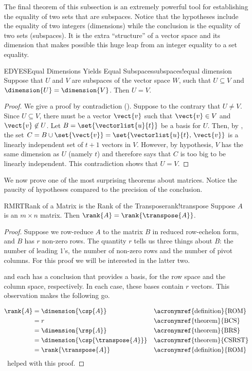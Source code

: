%
The final theorem of this subsection is an extremely powerful tool for establishing the equality of two sets that are subspaces.  Notice that the hypotheses include the equality of two integers (dimensions) while the conclusion is the equality of two sets (subspaces).  It is the extra ``structure'' of a vector space and its dimension that makes possible this huge leap from an integer equality to a set equality.
%
\begin{theorem}{EDYES}{Equal Dimensions Yields Equal Subspaces}{subspaces!equal dimension}
Suppose that $U$ and $V$ are subspaces of the vector space $W$, such that $U\subseteq V$ and $\dimension{U}=\dimension{V}$.  Then $U=V$.
\end{theorem}
%
\begin{proof}
%
We give a proof by contradiction ().  Suppose to the contrary that $U\neq V$.  Since $U\subseteq V$, there must be a vector $\vect{v}$ such that $\vect{v}\in V$ and $\vect{v}\not\in U$.  Let $B=\set{\vectorlist{u}{t}}$ be a basis for $U$.  Then, by , the set $C=B\cup\set{\vect{v}}=\set{\vectorlist{u}{t},\,\vect{v}}$ is a linearly independent set of $t+1$ vectors in $V$.  However, by hypothesis, $V$ has the same dimension as $U$ (namely $t$) and therefore  says that $C$ is too big to be linearly independent.  This contradiction shows that $U=V$.
%
\end{proof}
%
%
We now prove one of the most surprising theorems about matrices.  Notice the paucity of hypotheses compared to the precision of the conclusion.
%
\begin{theorem}{RMRT}{Rank of a Matrix is the Rank of the Transpose}{rank!transpose}
Suppose $A$ is an $m\times n$ matrix.  Then $\rank{A}=\rank{\transpose{A}}$.
\end{theorem}
%
\begin{proof}
%
Suppose we row-reduce $A$ to the matrix $B$ in reduced row-echelon form, and $B$ has $r$ non-zero rows.  The quantity $r$ tells us three things about $B$: the number of leading 1's, the number of non-zero rows and the number of pivot columns.  For this proof we will be interested in the latter two.\par
%
 and  each has a conclusion that provides a basis, for the row space and the column space, respectively.  In each case, these bases contain $r$ vectors.  This observation makes the following go.\par
%
\begin{align*}
\rank{A}
%
&=\dimension{\csp{A}}&&\text{\acronymref{definition}{ROM}}\\
%
&=r&&\text{\acronymref{theorem}{BCS}}\\
%
&=\dimension{\rsp{A}}&&\text{\acronymref{theorem}{BRS}}\\
%
&=\dimension{\csp{\transpose{A}}}&&\text{\acronymref{theorem}{CSRST}}\\
%
&=\rank{\transpose{A}}&&\text{\acronymref{definition}{ROM}}
%
\end{align*}
%
\jacoblinenthal\ helped with this proof.
\end{proof}
